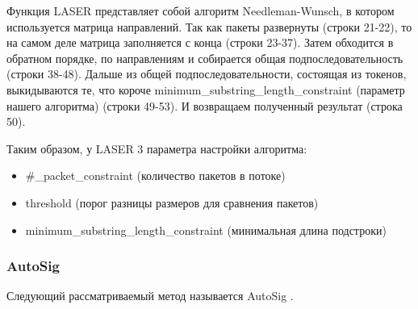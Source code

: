 Функция LASER представляет собой алгоритм Needleman-Wunsch, в котором используется матрица направлений.
Так как пакеты развернуты (строки 21-22), то на самом деле матрица заполняется с конца (строки 23-37).
Затем обходится в обратном порядке, по направлениям и собирается общая подпоследовательность (строки 38-48).
Дальше из общей подпоследовательности, состоящая из токенов, выкидываются те, что короче minimum\_substring\_length\_constraint (параметр нашего алгоритма) (строки 49-53).
И возвращаем полученный результат (строка 50).

Таким образом, у LASER 3 параметра настройки алгоритма:
\begin{itemize}
    \item \#\_packet\_constraint (количество пакетов в потоке)
    \item threshold (порог разницы размеров для сравнения пакетов)
    \item minimum\_substring\_length\_constraint (минимальная длина подстроки)
\end{itemize}

\subsubsection{AutoSig}

Следующий рассматриваемый метод называется AutoSig \cite{santosautomatic,ye2009autosig}.

\newpage
